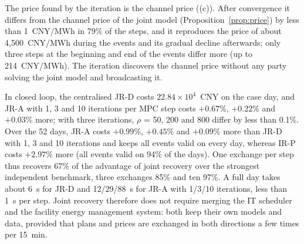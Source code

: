 The price found by the iteration is the channel price ((c)). After convergence it differs from the
channel price of the joint model (Proposition~\ref{prop:price}) by less than 1~CNY/MWh in 79\% of the steps, and it
reproduces the price of about 4,500~CNY/MWh during the events and its gradual decline afterwards; only three steps at
the beginning and end of the events differ more (up to 214~CNY/MWh). The iteration discovers the channel price without
any party solving the joint model and broadcasting it.

In closed loop, the centralised JR-D costs $22.84\times10^4$~CNY on the case day, and JR-A with 1, 3 and 10 iterations
per MPC step costs $+0.67\%$, $+0.22\%$ and $+0.03\%$ more; with three iterations, $\rho$ = 50, 200 and 800 differ by
less than 0.1\%. Over the 52 days, JR-A costs $+0.99\%$, $+0.45\%$ and $+0.09\%$ more than JR-D with 1, 3 and 10
iterations and keeps all events valid on every day, whereas IR-P costs $+2.97\%$ more (all events valid on 94\% of the
days). One exchange per step thus recovers 67\% of the advantage of joint recovery over the strongest independent
benchmark, three exchanges 85\% and ten 97\%. A full day takes about 6~s for JR-D and 12/29/88~s for JR-A with
1/3/10 iterations, less than 1~s per step. Joint recovery therefore does not require merging the IT scheduler and the
facility energy management system: both keep their own models and data, provided that plans and prices are exchanged in
both directions a few times per 15~min.
